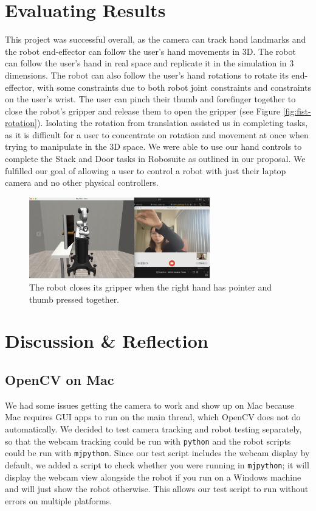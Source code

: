 \documentclass{article}
\begin{document}
\section{Evaluating Results}
\label{sec:result}
This project was successful overall, as the camera can track hand landmarks and
the robot end-effector can follow the user's hand movements in 3D. The robot
can follow the user's hand in real space and replicate it in the simulation in
3 dimensions. The robot can also follow the user's hand rotations to rotate its
end-effector, with some constraints due to both robot joint constraints and
constraints on the user's wrist. The user can pinch their thumb and forefinger
together to close the robot's gripper and release them to open the gripper (see
Figure \ref{fig:fist-rotation}). Isolating the rotation from translation
assisted us in completing tasks, as it is difficult for a user to concentrate
on rotation and movement at once when trying to manipulate in the 3D space. We
were able to use our hand controls to complete the Stack and Door tasks in
Robosuite as outlined in our proposal. We fulfilled our goal of allowing a user
to control a robot with just their laptop camera and no other physical
controllers.
\begin{figure}[H]
  \centering
  \includegraphics[width=0.7\textwidth]{gripper.png}
  \caption{The robot closes its gripper when the right hand has pointer and thumb pressed together.  }
  \label{fig:gripper}
\end{figure}

\section{Discussion \& Reflection}
\label{sec:conclusion}
\subsection{OpenCV on Mac}
We had some issues getting the camera to work and show up on Mac because Mac
requires GUI apps to run on the main thread, which OpenCV does not do
automatically. We decided to test camera tracking and robot testing separately,
so that the webcam tracking could be run with \texttt{python} and the robot
scripts could be run with \texttt{mjpython}. Since our test script includes the
webcam display by default, we added a script to check whether you were running
in \texttt{mjpython}; it will display the webcam view alongside the robot if
you run on a Windows machine and will just show the robot otherwise. This
allows our test script to run without errors on multiple platforms.
\end{document}
